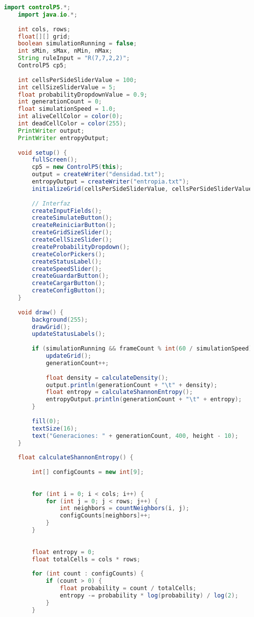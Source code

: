 \documentclass{article}
\begin{document}
 		\begin{lstlisting}[language=Java, basicstyle=\tiny, breaklines=true, breakatwhitespace=true]
 	import controlP5.*;
 	import java.io.*;
 	
 	int cols, rows;
 	float[][] grid;
 	boolean simulationRunning = false;
 	int sMin, sMax, nMin, nMax;
 	String ruleInput = "R(7,7,2,2)";
 	ControlP5 cp5;
 	
 	int cellsPerSideSliderValue = 100;
 	int cellSizeSliderValue = 5;
 	float probabilityDropdownValue = 0.9;
 	int generationCount = 0;
 	float simulationSpeed = 1.0;
 	int aliveCellColor = color(0); 
 	int deadCellColor = color(255);
 	PrintWriter output;
 	PrintWriter entropyOutput;
 	
 	void setup() {
 		fullScreen();
 		cp5 = new ControlP5(this);
 		output = createWriter("densidad.txt");
 		entropyOutput = createWriter("entropia.txt");
 		initializeGrid(cellsPerSideSliderValue, cellsPerSideSliderValue);
 		
 		// Interfaz 
 		createInputFields();
 		createSimulateButton();
 		createReiniciarButton();
 		createGridSizeSlider();
 		createCellSizeSlider();
 		createProbabilityDropdown();
 		createColorPickers();
 		createStatusLabel();
 		createSpeedSlider();
 		createGuardarButton();
 		createCargarButton(); 
 		createConfigButton();
 	}
 	
 	void draw() {
 		background(255);
 		drawGrid();
 		updateStatusLabels(); 
 		
 		if (simulationRunning && frameCount % int(60 / simulationSpeed) == 0) {
 			updateGrid();
 			generationCount++;
 			
 			float density = calculateDensity();
 			output.println(generationCount + "\t" + density);
 			float entropy = calculateShannonEntropy();
 			entropyOutput.println(generationCount + "\t" + entropy);
 		}
 		
 		fill(0);
 		textSize(16);
 		text("Generaciones: " + generationCount, 400, height - 10);
 	}
 	
 	float calculateShannonEntropy() {
 		
 		int[] configCounts = new int[9];
 		
 		
 		for (int i = 0; i < cols; i++) {
 			for (int j = 0; j < rows; j++) {
 				int neighbors = countNeighbors(i, j);
 				configCounts[neighbors]++;
 			}
 		}
 		
 		
 		float entropy = 0;
 		float totalCells = cols * rows;
 		
 		for (int count : configCounts) {
 			if (count > 0) {
 				float probability = count / totalCells;
 				entropy -= probability * log(probability) / log(2);
 			}
 		}
 		

\end{lstlisting}
\end{document}
